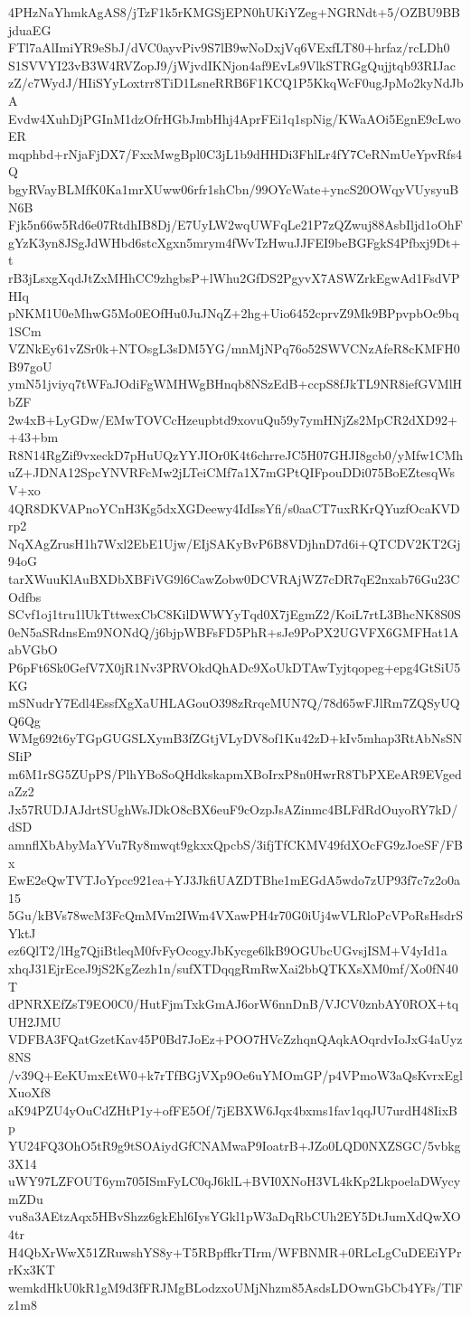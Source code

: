 4PHzNaYhmkAgAS8/jTzF1k5rKMGSjEPN0hUKiYZeg+NGRNdt+5/OZBU9BBjduaEG
FTl7aAlImiYR9eSbJ/dVC0ayvPiv9S7lB9wNoDxjVq6VExfLT80+hrfaz/rcLDh0
S1SVVYI23vB3W4RVZopJ9/jWjvdIKNjon4af9EvLs9VlkSTRGgQujjtqb93RIJac
zZ/c7WydJ/HIiSYyLoxtrr8TiD1LsneRRB6F1KCQ1P5KkqWcF0ugJpMo2kyNdJbA
Evdw4XuhDjPGInM1dzOfrHGbJmbHhj4AprFEi1q1spNig/KWaAOi5EgnE9cLwoER
mqphbd+rNjaFjDX7/FxxMwgBpl0C3jL1b9dHHDi3FhlLr4fY7CeRNmUeYpvRfs4Q
bgyRVayBLMfK0Ka1mrXUww06rfr1shCbn/99OYcWate+yncS20OWqyVUysyuBN6B
Fjk5n66w5Rd6e07RtdhIB8Dj/E7UyLW2wqUWFqLe21P7zQZwuj88AsbIljd1oOhF
gYzK3yn8JSgJdWHbd6stcXgxn5mrym4fWvTzHwuJJFEI9beBGFgkS4Pfbxj9Dt+t
rB3jLsxgXqdJtZxMHhCC9zhgbsP+lWhu2GfDS2PgyvX7ASWZrkEgwAd1FsdVPHIq
pNKM1U0eMhwG5Mo0EOfHu0JuJNqZ+2hg+Uio6452cprvZ9Mk9BPpvpbOc9bq1SCm
VZNkEy61vZSr0k+NTOsgL3sDM5YG/mnMjNPq76o52SWVCNzAfeR8cKMFH0B97goU
ymN51jviyq7tWFaJOdiFgWMHWgBHnqb8NSzEdB+ccpS8fJkTL9NR8iefGVMlHbZF
2w4xB+LyGDw/EMwTOVCcHzeupbtd9xovuQu59y7ymHNjZs2MpCR2dXD92++43+bm
R8N14RgZif9vxeckD7pHuUQzYYJIOr0K4t6chrreJC5H07GHJI8gcb0/yMfw1CMh
uZ+JDNA12SpcYNVRFcMw2jLTeiCMf7a1X7mGPtQIFpouDDi075BoEZtesqWsV+xo
4QR8DKVAPnoYCnH3Kg5dxXGDeewy4IdIssYfi/s0aaCT7uxRKrQYuzfOcaKVDrp2
NqXAgZrusH1h7Wxl2EbE1Ujw/EIjSAKyBvP6B8VDjhnD7d6i+QTCDV2KT2Gj94oG
tarXWuuKlAuBXDbXBFiVG9l6CawZobw0DCVRAjWZ7cDR7qE2nxab76Gu23COdfbs
SCvf1oj1tru1lUkTttwexCbC8KilDWWYyTqd0X7jEgmZ2/KoiL7rtL3BhcNK8S0S
0eN5aSRdnsEm9NONdQ/j6bjpWBFsFD5PhR+sJe9PoPX2UGVFX6GMFHat1AabVGbO
P6pFt6Sk0GefV7X0jR1Nv3PRVOkdQhADc9XoUkDTAwTyjtqopeg+epg4GtSiU5KG
mSNudrY7Edl4EssfXgXaUHLAGouO398zRrqeMUN7Q/78d65wFJlRm7ZQSyUQQ6Qg
WMg692t6yTGpGUGSLXymB3fZGtjVLyDV8of1Ku42zD+kIv5mhap3RtAbNsSNSIiP
m6M1rSG5ZUpPS/PlhYBoSoQHdkskapmXBoIrxP8n0HwrR8TbPXEeAR9EVgedaZz2
Jx57RUDJAJdrtSUghWsJDkO8cBX6euF9cOzpJsAZinmc4BLFdRdOuyoRY7kD/dSD
amnflXbAbyMaYVu7Ry8mwqt9gkxxQpcbS/3ifjTfCKMV49fdXOcFG9zJoeSF/FBx
EwE2eQwTVTJoYpcc921ea+YJ3JkfiUAZDTBhe1mEGdA5wdo7zUP93f7c7z2o0a15
5Gu/kBVs78wcM3FcQmMVm2IWm4VXawPH4r70G0iUj4wVLRloPcVPoRsHsdrSYktJ
ez6QlT2/lHg7QjiBtleqM0fvFyOcogyJbKycge6lkB9OGUbcUGvsjISM+V4yId1a
xhqJ31EjrEceJ9jS2KgZezh1n/sufXTDqqgRmRwXai2bbQTKXsXM0mf/Xo0fN40T
dPNRXEfZsT9EO0C0/HutFjmTxkGmAJ6orW6nnDnB/VJCV0znbAY0ROX+tqUH2JMU
VDFBA3FQatGzetKav45P0Bd7JoEz+POO7HVcZzhqnQAqkAOqrdvIoJxG4aUyz8NS
/v39Q+EeKUmxEtW0+k7rTfBGjVXp9Oe6uYMOmGP/p4VPmoW3aQsKvrxEglXuoXf8
aK94PZU4yOuCdZHtP1y+ofFE5Of/7jEBXW6Jqx4bxms1fav1qqJU7urdH48IixBp
YU24FQ3OhO5tR9g9tSOAiydGfCNAMwaP9IoatrB+JZo0LQD0NXZSGC/5vbkg3X14
uWY97LZFOUT6ym705ISmFyLC0qJ6klL+BVI0XNoH3VL4kKp2LkpoelaDWycymZDu
vu8a3AEtzAqx5HBvShzz6gkEhl6IysYGkl1pW3aDqRbCUh2EY5DtJumXdQwXO4tr
H4QbXrWwX51ZRuwshYS8y+T5RBpffkrTIrm/WFBNMR+0RLcLgCuDEEiYPrrKx3KT
wemkdHkU0kR1gM9d3fFRJMgBLodzxoUMjNhzm85AsdsLDOwnGbCb4YFs/TlFz1m8
